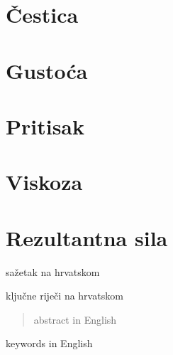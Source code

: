 \documentclass[diplomskirad]{fer}
\begin{document}
    \section{Čestica}\label{sec:cestica}
    \section{Gustoća}\label{sec:gustoca}
    \section{Pritisak}\label{sec:pritisak}
    \section{Viskoza}\label{sec:viskoza}
    \section{Rezultantna sila}\label{sec:rezultantna-sila}


    
    \begin{sazetak}
        sažetak na hrvatskom
    \end{sazetak}
    \begin{kljucnerijeci}
        ključne riječi na hrvatskom
    \end{kljucnerijeci}
    \begin{abstract}
        abstract in English
    \end{abstract}
    \begin{keywords}
        keywords in English
    \end{keywords}
\end{document}
